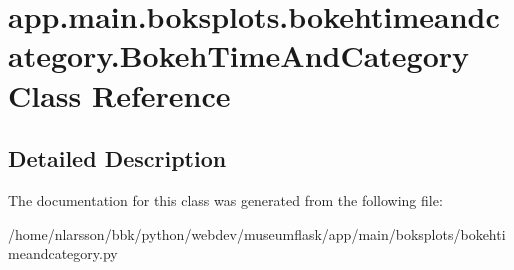 \hypertarget{classapp_1_1main_1_1boksplots_1_1bokehtimeandcategory_1_1BokehTimeAndCategory}{}\section{app.\+main.\+boksplots.\+bokehtimeandcategory.\+Bokeh\+Time\+And\+Category Class Reference}
\label{classapp_1_1main_1_1boksplots_1_1bokehtimeandcategory_1_1BokehTimeAndCategory}


\subsection{Detailed Description}


 

The documentation for this class was generated from the following file\+:\begin{DoxyCompactItemize}
\item 
/home/nlarsson/bbk/python/webdev/museumflask/app/main/boksplots/bokehtimeandcategory.\+py\end{DoxyCompactItemize}
